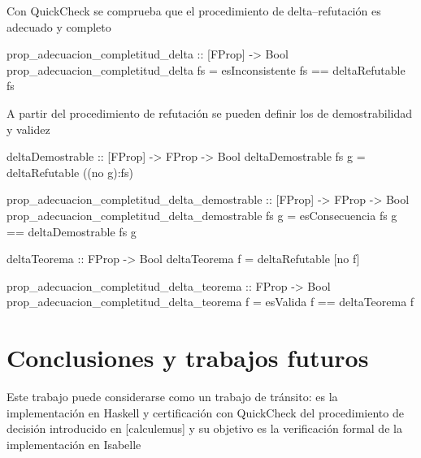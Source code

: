 \documentclass{llncs}
\begin{document}
Con QuickCheck se comprueba que el procedimiento de delta--refutación es
adecuado y completo
\begin{code}
prop_adecuacion_completitud_delta :: [FProp] -> Bool
prop_adecuacion_completitud_delta fs = 
    esInconsistente fs == deltaRefutable fs
\end{code}

A partir del procedimiento de refutación se pueden definir los de
demostrabilidad y validez
\begin{code}
deltaDemostrable :: [FProp] -> FProp -> Bool
deltaDemostrable fs g = deltaRefutable ((no g):fs)

prop_adecuacion_completitud_delta_demostrable :: [FProp] -> 
                                                 FProp -> 
                                                 Bool
prop_adecuacion_completitud_delta_demostrable fs g =
    esConsecuencia fs g == deltaDemostrable fs g

deltaTeorema :: FProp -> Bool
deltaTeorema f = deltaRefutable [no f]

prop_adecuacion_completitud_delta_teorema :: FProp -> Bool
prop_adecuacion_completitud_delta_teorema f =
    esValida f == deltaTeorema f
\end{code}

\section{Conclusiones y trabajos futuros}

Este trabajo puede considerarse como un trabajo de tránsito: es la
implementación en Haskell y certificación con QuickCheck del procedimiento de
decisión introducido en [calculemus] y su objetivo es la verificación formal
de la implementación en Isabelle
\end{document}
